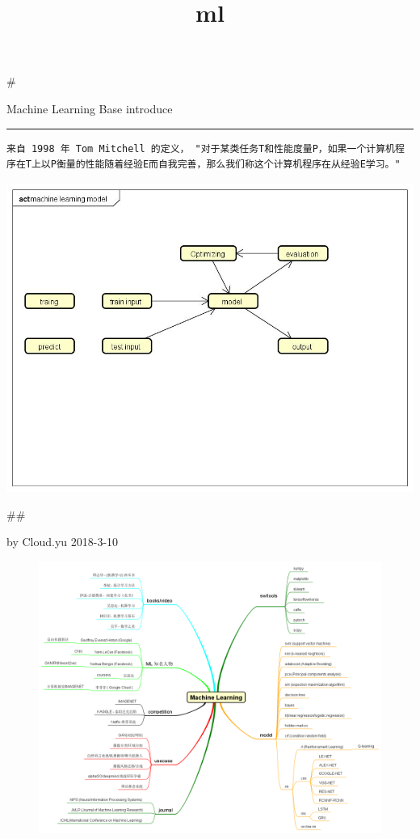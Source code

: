 \documentclass[11pt]{article}
\title{ml}
\makeatletter
\def\maxwidth{\ifdim\Gin@nat@width>\linewidth\linewidth
    \else\Gin@nat@width\fi}
\let\Oldincludegraphics\includegraphics
\renewcommand{\includegraphics}[1]{\Oldincludegraphics[width=.8\maxwidth]{#1}}
\makeatother
\begin{document}
    
    
    \maketitle
    
    

    
    \#

Machine Learning Base introduce

\begin{center}\rule{0.5\linewidth}{\linethickness}\end{center}

\begin{verbatim}
来自 1998 年 Tom Mitchell 的定义， "对于某类任务T和性能度量P，如果一个计算机程序在T上以P衡量的性能随着经验E而自我完善，那么我们称这个计算机程序在从经验E学习。"
\end{verbatim}

 \includegraphics{ml__model.jpg}

\#\#

by Cloud.yu 2018-3-10

    \begin{figure}
\centering
\includegraphics{mlmindmap.png}
\caption{}
\end{figure}
\end{document}
